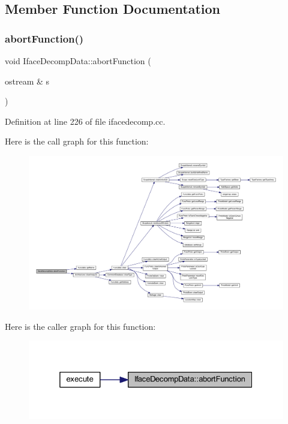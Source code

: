 \subsection{Member Function Documentation}
\mbox{\label{class_iface_decomp_data_aa1909a91f347f8925d2932da078b20bf}} 
\subsubsection{\texorpdfstring{abortFunction()}{abortFunction()}}
{\footnotesize\ttfamily void Iface\+Decomp\+Data\+::abort\+Function (\begin{DoxyParamCaption}\item[{ostream \&}]{s }\end{DoxyParamCaption})}



Definition at line 226 of file ifacedecomp.\+cc.

Here is the call graph for this function\+:
\nopagebreak
\begin{figure}[H]
\begin{center}
\leavevmode
\includegraphics[width=350pt]{class_iface_decomp_data_aa1909a91f347f8925d2932da078b20bf_cgraph}
\end{center}
\end{figure}
Here is the caller graph for this function\+:
\nopagebreak
\begin{figure}[H]
\begin{center}
\leavevmode
\includegraphics[width=325pt]{class_iface_decomp_data_aa1909a91f347f8925d2932da078b20bf_icgraph}
\end{center}
\end{figure}
\mbox{\label{class_iface_decomp_data_a23c95a500eccef410cbe4049b2d3cce3}} 
